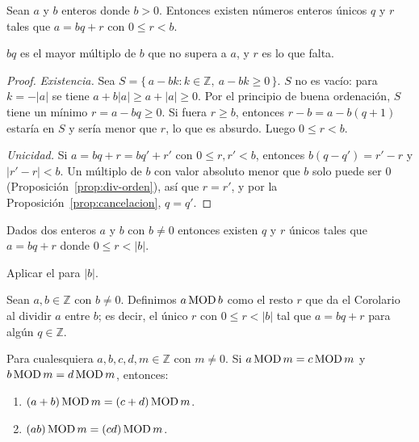 \begin{theorem}\label{teo:division}
    Sean $a$ y $b$ enteros donde $b > 0$. Entonces existen números enteros únicos $q$ y $r$ tales que
    $a = bq + r$ con $0 \le r < b$.
\end{theorem}

\begin{idea}
    $bq$ es el mayor múltiplo de $b$ que no supera a $a$, y $r$ es lo que falta.
\end{idea}

\begin{proof}
    \emph{Existencia.} Sea $S = \{\, a - bk : k \in \mathbb{Z},\ a - bk \ge 0 \,\}$.
    $S$ no es vacío: para $k = -|a|$ se tiene $a + b|a| \ge a + |a| \ge 0$.
    Por el principio de buena ordenación, $S$ tiene un mínimo $r = a - bq \ge 0$.
    Si fuera $r \ge b$, entonces $r - b = a - b(q+1)$ estaría en $S$ y sería menor
    que $r$, lo que es absurdo. Luego $0 \le r < b$.

    \emph{Unicidad.} Si $a = bq + r = bq' + r'$ con $0 \le r, r' < b$, entonces
    $b(q - q') = r' - r$ y $|r' - r| < b$. Un múltiplo de $b$ con valor absoluto
    menor que $b$ solo puede ser $0$ (Proposición~\ref{prop:div-orden}), así que
    $r = r'$, y por la Proposición~\ref{prop:cancelacion}, $q = q'$.
\end{proof}

\begin{corollary}\label{cor:division}
    Dados dos enteros $a$ y $b$ con $b \ne 0$ entonces existen $q$ y $r$ únicos tales que
    $a = bq + r$ donde $0 \le r < |b|$.
\end{corollary}

\begin{idea}
    Aplicar el  para $|b|$.
\end{idea}

\begin{definition}\label{def:mod}
    Sean $a, b \in \mathbb{Z}$ con $b \neq 0$. Definimos $a \operatorname{MOD} b$ como el resto $r$
    que da el Corolario~ al dividir $a$ entre $b$; es decir,
    el único $r$ con $0 \le r < |b|$ tal que $a = bq + r$ para algún $q \in \mathbb{Z}$.
\end{definition}

\begin{proposition}\label{prop:mod}
    Para cualesquiera $a, b, c, d, m \in \mathbb{Z}$ con $m \ne 0$.
    Si $a \operatorname{MOD} m = c \operatorname{MOD} m$ y $b \operatorname{MOD} m = d \operatorname{MOD} m$, entonces:
    \begin{enumerate}[label= (\arabic*), ref=\theproposition(\arabic*)]
        \item\label{prop:mod-suma} $(a+b) \operatorname{MOD} m = (c+d) \operatorname{MOD} m$.
        \item\label{prop:mod-producto} $(ab) \operatorname{MOD} m = (cd) \operatorname{MOD} m$.
    \end{enumerate}
\end{proposition}

